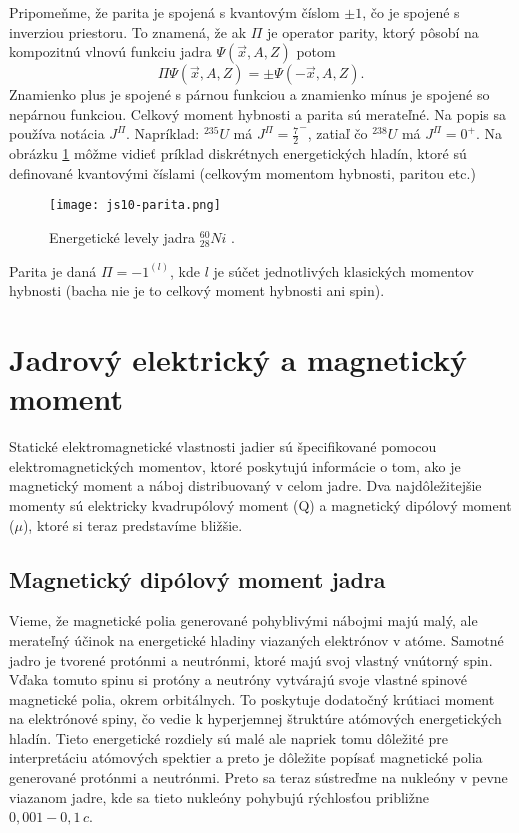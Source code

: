 \documentclass[../../main.tex]{subfiles}
\begin{document}
Pripomeňme, že parita je spojená s kvantovým číslom $\pm1$, čo je spojené s inverziou priestoru. To znamená, že ak $\Pi$ je operator parity, ktorý pôsobí na kompozitnú vlnovú funkciu jadra $\Psi(\vec{x},A,Z)$
potom 
\begin{equation}
\Pi \Psi(\vec{x},A,Z)=\pm \Psi(-\vec{x},A,Z).
\end{equation}
Znamienko plus je spojené s párnou funkciou a znamienko mínus je spojené so nepárnou funkciou. Celkový moment hybnosti a parita sú merateľné. Na popis sa používa notácia $J^{\Pi}$. Napríklad: $^{235}U$ má $J^{\Pi}=\frac{7}{2}^{-}$, zatiaľ čo $^{238}U$ má $J^{\Pi}=0^{+}$. Na obrázku \ref{js10:spiny} môžme vidieť príklad diskrétnych energetických hladín, ktoré sú definované kvantovými číslami (celkovým momentom hybnosti, paritou etc.)
\begin{figure}[h]
 \centerline{\texttt{[image: js10-parita.png]}}
 \caption{Energetické levely jadra $_{28}^{60}Ni$ .}
 \label{js10:spiny}
\end{figure}
\newline
Parita je daná $\Pi=-1^{(l)}$, kde $l$ je súčet jednotlivých klasických momentov hybnosti (bacha nie je to celkový moment hybnosti ani spin).
\section{Jadrový elektrický a magnetický moment}
Statické elektromagnetické vlastnosti jadier sú špecifikované pomocou elektromagnetických momentov, ktoré poskytujú informácie o tom, ako je magnetický moment a náboj distribuovaný v celom jadre. Dva najdôležitejšie momenty sú elektricky kvadrupólový moment (Q) a magnetický dipólový moment ($\mu$), ktoré si teraz predstavíme bližšie.
\subsection{Magnetický dipólový moment jadra}
Vieme, že magnetické polia generované pohyblivými nábojmi majú malý, ale merateľný účinok na energetické hladiny viazaných elektrónov v atóme. Samotné jadro je tvorené protónmi a neutrónmi, ktoré majú svoj vlastný vnútorný spin. Vďaka tomuto spinu si protóny a neutróny vytvárajú svoje vlastné spinové magnetické polia, okrem orbitálnych. To poskytuje dodatočný krútiaci moment na elektrónové spiny, čo vedie k hyperjemnej štruktúre atómových energetických hladín. Tieto energetické rozdiely sú malé ale napriek tomu dôležité pre interpretáciu atómových spektier a preto je dôležite popísať magnetické polia generované protónmi a neutrónmi. Preto sa teraz sústreďme na nukleóny v pevne viazanom jadre, kde sa tieto nukleóny pohybujú rýchlosťou približne $0,001-0,1\,c$.
\end{document}
